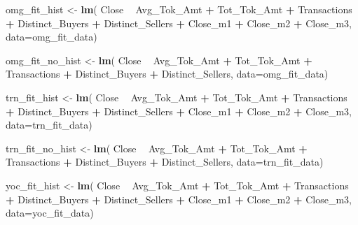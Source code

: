 \documentclass[]{article}
\newenvironment{Shaded}{\begin{snugshade}}{\end{snugshade}}
\newcommand{\KeywordTok}[1]{\textcolor[rgb]{0.13,0.29,0.53}{\textbf{#1}}}
\newcommand{\DataTypeTok}[1]{\textcolor[rgb]{0.13,0.29,0.53}{#1}}
\newcommand{\StringTok}[1]{\textcolor[rgb]{0.31,0.60,0.02}{#1}}
\newcommand{\OperatorTok}[1]{\textcolor[rgb]{0.81,0.36,0.00}{\textbf{#1}}}
\newcommand{\NormalTok}[1]{#1}
\begin{document}
\begin{Shaded}
\begin{Highlighting}[]
\NormalTok{omg_fit_hist <-}\StringTok{ }\KeywordTok{lm}\NormalTok{(}
\NormalTok{  Close }\OperatorTok{~}\StringTok{ }\NormalTok{Avg_Tok_Amt }\OperatorTok{+}
\StringTok{    }\NormalTok{Tot_Tok_Amt }\OperatorTok{+}
\StringTok{    }\NormalTok{Transactions }\OperatorTok{+}
\StringTok{    }\NormalTok{Distinct_Buyers }\OperatorTok{+}
\StringTok{    }\NormalTok{Distinct_Sellers }\OperatorTok{+}
\StringTok{    }\NormalTok{Close_m1 }\OperatorTok{+}
\StringTok{    }\NormalTok{Close_m2 }\OperatorTok{+}
\StringTok{    }\NormalTok{Close_m3,}
  \DataTypeTok{data=}\NormalTok{omg_fit_data)}

\NormalTok{omg_fit_no_hist <-}\StringTok{ }\KeywordTok{lm}\NormalTok{(}
\NormalTok{  Close }\OperatorTok{~}\StringTok{ }\NormalTok{Avg_Tok_Amt }\OperatorTok{+}
\StringTok{    }\NormalTok{Tot_Tok_Amt }\OperatorTok{+}
\StringTok{    }\NormalTok{Transactions }\OperatorTok{+}
\StringTok{    }\NormalTok{Distinct_Buyers }\OperatorTok{+}
\StringTok{    }\NormalTok{Distinct_Sellers,}
  \DataTypeTok{data=}\NormalTok{omg_fit_data)}

\NormalTok{trn_fit_hist <-}\StringTok{ }\KeywordTok{lm}\NormalTok{(}
\NormalTok{  Close }\OperatorTok{~}\StringTok{ }\NormalTok{Avg_Tok_Amt }\OperatorTok{+}
\StringTok{    }\NormalTok{Tot_Tok_Amt }\OperatorTok{+}
\StringTok{    }\NormalTok{Transactions }\OperatorTok{+}
\StringTok{    }\NormalTok{Distinct_Buyers }\OperatorTok{+}
\StringTok{    }\NormalTok{Distinct_Sellers }\OperatorTok{+}
\StringTok{    }\NormalTok{Close_m1 }\OperatorTok{+}
\StringTok{    }\NormalTok{Close_m2 }\OperatorTok{+}
\StringTok{    }\NormalTok{Close_m3,}
  \DataTypeTok{data=}\NormalTok{trn_fit_data)}

\NormalTok{trn_fit_no_hist <-}\StringTok{ }\KeywordTok{lm}\NormalTok{(}
\NormalTok{  Close }\OperatorTok{~}\StringTok{ }\NormalTok{Avg_Tok_Amt }\OperatorTok{+}
\StringTok{    }\NormalTok{Tot_Tok_Amt }\OperatorTok{+}
\StringTok{    }\NormalTok{Transactions }\OperatorTok{+}
\StringTok{    }\NormalTok{Distinct_Buyers }\OperatorTok{+}
\StringTok{    }\NormalTok{Distinct_Sellers,}
  \DataTypeTok{data=}\NormalTok{trn_fit_data)}

\NormalTok{yoc_fit_hist <-}\StringTok{ }\KeywordTok{lm}\NormalTok{(}
\NormalTok{  Close }\OperatorTok{~}\StringTok{ }\NormalTok{Avg_Tok_Amt }\OperatorTok{+}
\StringTok{    }\NormalTok{Tot_Tok_Amt }\OperatorTok{+}
\StringTok{    }\NormalTok{Transactions }\OperatorTok{+}
\StringTok{    }\NormalTok{Distinct_Buyers }\OperatorTok{+}
\StringTok{    }\NormalTok{Distinct_Sellers }\OperatorTok{+}
\StringTok{    }\NormalTok{Close_m1 }\OperatorTok{+}
\StringTok{    }\NormalTok{Close_m2 }\OperatorTok{+}
\StringTok{    }\NormalTok{Close_m3,}
  \DataTypeTok{data=}\NormalTok{yoc_fit_data)}


\end{Highlighting}
\end{Shaded}
\end{document}
